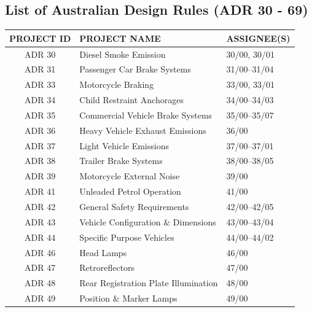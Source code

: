     \subsection{List of Australian Design Rules (ADR 30 - 69)}
        \begin{table}[h]
            \centering
            \renewcommand{\arraystretch}{1.2}
            \begin{tabularx}{\textwidth}{|c|X|X|}
            \hline
            \textbf{PROJECT ID} & \textbf{PROJECT NAME} & \textbf{ASSIGNEE(S)} \\
            \hline
            
            ADR 30 & Diesel Smoke Emission & 30/00, 30/01 \\
            ADR 31 & Passenger Car Brake Systems & 31/00–31/04 \\
            ADR 33 & Motorcycle Braking & 33/00, 33/01 \\
            ADR 34 & Child Restraint Anchorages & 34/00–34/03 \\
            ADR 35 & Commercial Vehicle Brake Systems & 35/00–35/07 \\
            ADR 36 & Heavy Vehicle Exhaust Emissions & 36/00 \\
            ADR 37 & Light Vehicle Emissions & 37/00–37/01 \\
            ADR 38 & Trailer Brake Systems & 38/00–38/05 \\
            ADR 39 & Motorcycle External Noise & 39/00 \\
            
            ADR 41 & Unleaded Petrol Operation & 41/00 \\
            ADR 42 & General Safety Requirements & 42/00–42/05 \\
            ADR 43 & Vehicle Configuration \& Dimensions & 43/00–43/04 \\
            ADR 44 & Specific Purpose Vehicles & 44/00–44/02 \\
            ADR 46 & Head Lamps & 46/00 \\
            ADR 47 & Retroreflectors & 47/00 \\
            ADR 48 & Rear Registration Plate Illumination & 48/00 \\
            ADR 49 & Position \& Marker Lamps & 49/00 \\
            

\end{tabularx}
\end{table}
